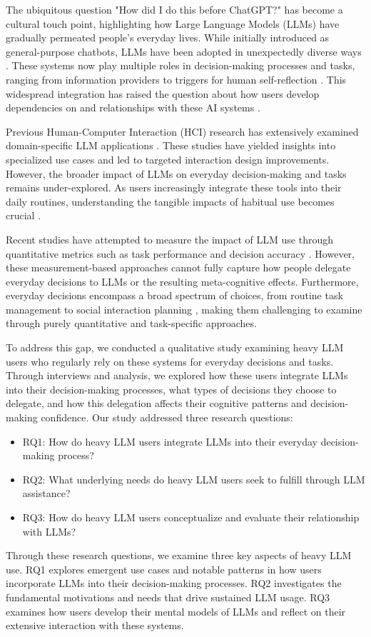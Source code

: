 The ubiquitous question "How did I do this before ChatGPT?" has become a cultural touch point, highlighting how Large Language Models (LLMs) have gradually permeated people's everyday lives. While initially introduced as general-purpose chatbots, LLMs have been adopted in unexpectedly diverse ways \cite{chkirbene2024applications}. These systems now play multiple roles in decision-making processes and tasks, ranging from information providers to triggers for human self-reflection \cite{kim2022bridging, kmmer2024effects}. This widespread integration has raised the question about how users develop dependencies on and relationships with these AI systems \cite{he2025conversational}.

Previous Human-Computer Interaction (HCI) research has extensively examined domain-specific LLM applications \cite{jin2024teach, liu2024selenite}. These studies have yielded insights into specialized use cases and led to targeted interaction design improvements. However, the broader impact of LLMs on everyday decision-making and tasks remains under-explored. As users increasingly integrate these tools into their daily routines, understanding the tangible impacts of habitual use becomes crucial \cite{kmmer2024effects}. 

Recent studies have attempted to measure the impact of LLM use through quantitative metrics such as task performance and decision accuracy \cite{kim2025fostering}. However, these measurement-based approaches cannot fully capture how people delegate everyday decisions to LLMs or the resulting meta-cognitive effects. Furthermore, everyday decisions encompass a broad spectrum of choices, from routine task management to social interaction planning \cite{eigner2024determinants, dhami2012cct}, making them challenging to examine through purely quantitative and task-specific approaches.

To address this gap, we conducted a qualitative study examining heavy LLM users who regularly rely on these systems for everyday decisions and tasks. Through interviews and analysis, we explored how these users integrate LLMs into their decision-making processes, what types of decisions they choose to delegate, and how this delegation affects their cognitive patterns and decision-making confidence. Our study addressed three research questions: 

\begin{itemize}
\item RQ1: How do heavy LLM users integrate LLMs into their everyday decision-making process?
\item RQ2: What underlying needs do heavy LLM users seek to fulfill through LLM assistance?
\item RQ3: How do heavy LLM users conceptualize and evaluate their relationship with LLMs?
\end{itemize}

Through these research questions, we examine three key aspects of heavy LLM use. RQ1 explores emergent use cases and notable patterns in how users incorporate LLMs into their decision-making processes. RQ2 investigates the fundamental motivations and needs that drive sustained LLM usage. RQ3 examines how users develop their mental models of LLMs and reflect on their extensive interaction with these systems.